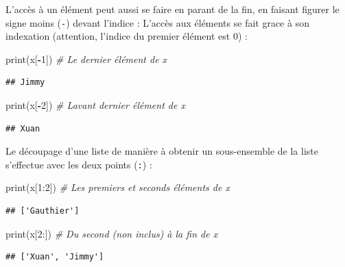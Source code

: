 \documentclass[
  12pt,
]{book}
\newenvironment{Shaded}{\begin{snugshade}}{\end{snugshade}}
\newcommand{\BuiltInTok}[1]{#1}
\newcommand{\CommentTok}[1]{\textcolor[rgb]{0.56,0.35,0.01}{\textit{#1}}}
\newcommand{\DecValTok}[1]{\textcolor[rgb]{0.00,0.00,0.81}{#1}}
\newcommand{\NormalTok}[1]{#1}
\newcommand{\OperatorTok}[1]{\textcolor[rgb]{0.81,0.36,0.00}{\textbf{#1}}}
\numberwithin{equation}{section}
\numberwithin{countremarque}{section}
\begin{document}
L'accès à un élément peut aussi se faire en parant de la fin, en faisant figurer le signe moins (\texttt{-}) devant l'indice :
L'accès aux éléments se fait grace à son indexation (attention, l'indice du premier élément est 0) :

\begin{Shaded}
\begin{Highlighting}[]
\BuiltInTok{print}\NormalTok{(x[}\OperatorTok{{-}}\DecValTok{1}\NormalTok{]) }\CommentTok{\# Le dernier élément de x}
\end{Highlighting}
\end{Shaded}

\begin{lstlisting}
## Jimmy
\end{lstlisting}

\begin{Shaded}
\begin{Highlighting}[]
\BuiltInTok{print}\NormalTok{(x[}\OperatorTok{{-}}\DecValTok{2}\NormalTok{]) }\CommentTok{\# L\textquotesingle{}avant dernier élément de x}
\end{Highlighting}
\end{Shaded}

\begin{lstlisting}
## Xuan
\end{lstlisting}

Le découpage d'une liste de manière à obtenir un sous-ensemble de la liste s'effectue avec les deux points (\texttt{:}) :

\begin{Shaded}
\begin{Highlighting}[]
\BuiltInTok{print}\NormalTok{(x[}\DecValTok{1}\NormalTok{:}\DecValTok{2}\NormalTok{]) }\CommentTok{\# Les premiers et seconds éléments de x}
\end{Highlighting}
\end{Shaded}

\begin{lstlisting}
## ['Gauthier']
\end{lstlisting}

\begin{Shaded}
\begin{Highlighting}[]
\BuiltInTok{print}\NormalTok{(x[}\DecValTok{2}\NormalTok{:]) }\CommentTok{\# Du second (non inclus) à la fin de x}
\end{Highlighting}
\end{Shaded}

\begin{lstlisting}
## ['Xuan', 'Jimmy']
\end{lstlisting}
\end{document}
